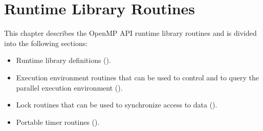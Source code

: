 %
%
%
%
%
%
%
%
%
%

\chapter{Runtime Library Routines}
\label{chap:Runtime Library Routines}
This chapter describes the OpenMP API runtime library routines and is divided into the 
following sections:

\begin{itemize}
\item Runtime library definitions 
().

\item Execution environment routines that can be used to control and to query the parallel 
execution environment 
().

\item Lock routines that can be used to synchronize access to data 
(). 

\item Portable timer routines 
().
\end{itemize}

